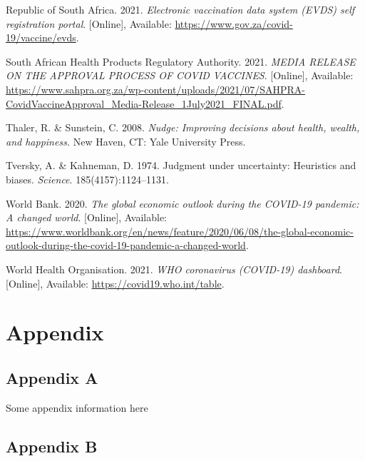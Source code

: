 \documentclass[11pt,preprint, authoryear]{elsarticle}
\numberwithin{equation}{section}
\numberwithin{figure}{section}
\numberwithin{table}{section}
\newlength{\cslhangindent}
\newenvironment{CSLReferences}%
  {\setlength{\parindent}{0pt}%
  \everypar{\setlength{\hangindent}{\cslhangindent}}\ignorespaces}%
  {\par}
\begin{document}
\begin{CSLReferences}{1}{0}
\leavevmode\hypertarget{ref-evds}{}%
Republic of South Africa. 2021. \emph{Electronic vaccination data system
(EVDS) self registration portal}. {[}Online{]}, Available:
\url{https://www.gov.za/covid-19/vaccine/evds}.

\leavevmode\hypertarget{ref-sah}{}%
South African Health Products Regulatory Authority. 2021. \emph{MEDIA
RELEASE ON THE APPROVAL PROCESS OF COVID VACCINES}. {[}Online{]},
Available:
\url{https://www.sahpra.org.za/wp-content/uploads/2021/07/SAHPRA-CovidVaccineApproval_Media-Release_1July2021_FINAL.pdf}.

\leavevmode\hypertarget{ref-nudge}{}%
Thaler, R. \& Sunstein, C. 2008. \emph{Nudge: Improving decisions about
health, wealth, and happiness.} New Haven, CT: Yale University Press.

\leavevmode\hypertarget{ref-khan}{}%
Tversky, A. \& Kahneman, D. 1974. Judgment under uncertainty: Heuristics
and biases. \emph{Science}. 185(4157):1124--1131.

\leavevmode\hypertarget{ref-bank}{}%
World Bank. 2020. \emph{The global economic outlook during the COVID-19
pandemic: A changed world}. {[}Online{]}, Available:
\url{https://www.worldbank.org/en/news/feature/2020/06/08/the-global-economic-outlook-during-the-covid-19-pandemic-a-changed-world}.

\leavevmode\hypertarget{ref-who}{}%
World Health Organisation. 2021. \emph{WHO coronavirus (COVID-19)
dashboard}. {[}Online{]}, Available:
\url{https://covid19.who.int/table}.

\end{CSLReferences}

\hypertarget{appendix}{%
\section*{Appendix}\label{appendix}}

\hypertarget{appendix-a}{%
\subsection*{Appendix A}\label{appendix-a}}

Some appendix information here

\hypertarget{appendix-b}{%
\subsection*{Appendix B}\label{appendix-b}}


\end{document}
